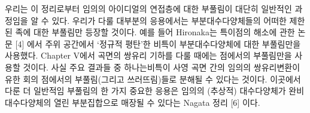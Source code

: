 	
	\begin{remark}
	우리는 이 정리로부터 임의의 아이디얼의 연접층에 대한 부풀림이 대단히 일반적인 과정임을 알 수 있다.
	우리가 다룰 대부분의 응용에서는 부분대수다양체들의 어떠한 제한된 족에 대한 부풀림만 등장할 것이다.
	예를 들어 Hironaka는 특이점의 해소에 관한 논문 [4] 에서 주위 공간에서 `정규적 평탄'한 비특이 부분대수다양체에 대한 부풀림만을 사용했다.
	Chapter V에서 곡면의 쌍유리 기하를 다룰 때에는 점에서의 부풀림만을 사용할 것이다.
	사실 주요 결과들 중 하나는비특이 사영 곡면 간의 임의의 쌍유리변환이
	유한 회의 점에서의 부풀림(그리고 쓰러뜨림)들로 분해될 수 있다는 것이다.
	이곳에서 다룬 더 일반적임 부풀림의 한 가지 중요한 응용은
	임의의 (추상적) 대수다양체가 완비 대수다양체의 열린 부분집합으로 매장될 수 있다는 Nagata 정리 [6] 이다.
	\end{remark}
	
